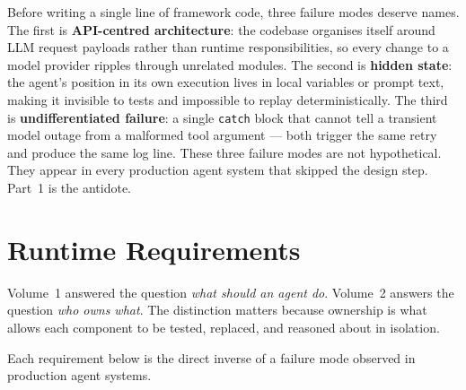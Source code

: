 

Before writing a single line of framework code, three failure modes deserve names.
The first is \textbf{API-centred architecture}: the codebase organises itself around
LLM request payloads rather than runtime responsibilities, so every change to a model
provider ripples through unrelated modules.
The second is \textbf{hidden state}: the agent's position in its own execution lives
in local variables or prompt text, making it invisible to tests and impossible to replay
deterministically.
The third is \textbf{undifferentiated failure}: a single \texttt{catch} block that
cannot tell a transient model outage from a malformed tool argument — both trigger the
same retry and produce the same log line.
These three failure modes are not hypothetical.
They appear in every production agent system that skipped the design step.
Part~1 is the antidote.

\section{Runtime Requirements}
\label{sec:runtime-requirements-recap}

Volume~1 answered the question \emph{what should an agent do}.
Volume~2 answers the question \emph{who owns what}.
The distinction matters because ownership is what allows each component to be
tested, replaced, and reasoned about in isolation.

Each requirement below is the direct inverse of a failure mode observed in
production agent systems.

